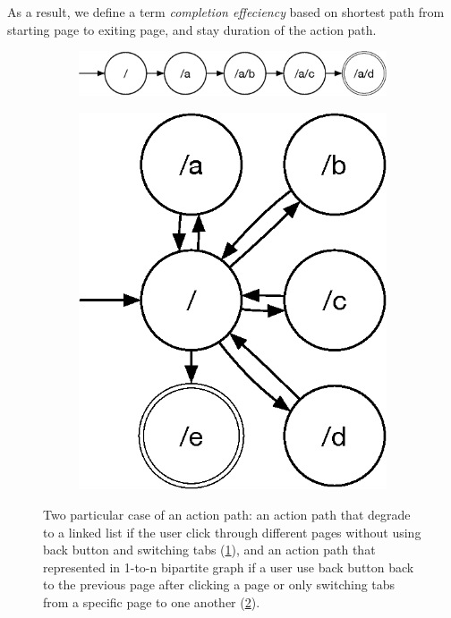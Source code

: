 As a result, we define a term \emph{completion effeciency} based on shortest path from 
starting page to exiting page, and stay duration of the action path. 

\begin{figure}[H]
    \centering

\begin{subfigure}[b]{0.55\textwidth}
    \includegraphics[width=1\textwidth]{figures/linked-list}
    \caption{}
    \label{fig:sim-action-1}
\end{subfigure}
    
\begin{subfigure}[b]{0.23\textwidth}
    \includegraphics[width=1\textwidth]{figures/1ton}
    \caption{}
    \label{fig:sim-action-2}
\end{subfigure}

\caption{Two particular case of an action path: an action path that degrade to 
a linked list if the user click through different pages without using back button and 
switching tabs (\ref{fig:sim-action-1}), and an action path that represented 
in 1-to-n bipartite graph if a user use back button back to the previous page after 
clicking a page or only switching tabs from a specific page to one another (\ref{fig:sim-action-2}).}
\label{fig:sim-action-path}
\end{figure}

